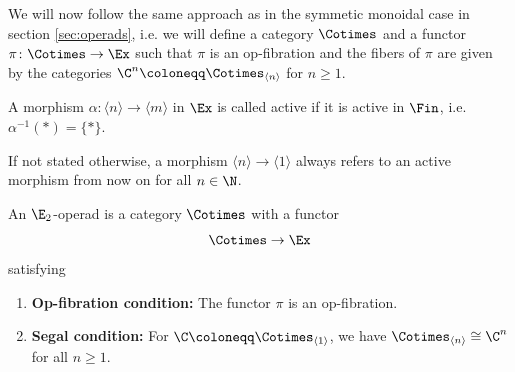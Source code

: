 We will now follow the same approach as in the symmetic monoidal case in section 
\ref{sec:operads}, i.e. we will define a category $\Cotimes$ and a functor 
$\pi \colon \Cotimes \to \Ex$ such that $\pi$ is an op-fibration and the fibers 
of $\pi$ are given by the categories $\C^n \coloneqq \Cotimes_{\langle n \rangle}$ for $n \geq 1$.

\begin{defin}
    A morphism $\alpha \colon \langle n \rangle \to \langle m \rangle$ in $\Ex$
    is called active if it is active in $\Fin$, i.e. $\alpha^{-1}(\ast) = \{\ast\}$.
\end{defin}

If not stated otherwise, a morphism $\langle n \rangle \to \langle 1 \rangle$ 
always refers to an active morphism from now on for all $n \in \N$.

\begin{defin}
    An $\E_2$-operad is a category $\Cotimes$ with a functor
    \[
        \Cotimes \to \Ex
    \]
    satisfying
        \begin{enumerate}[(M1)]
            \item \textbf{Op-fibration condition:} The functor $\pi$ is an op-fibration.
            \item \textbf{Segal condition:} For $\C \coloneqq \Cotimes_{\langle 1 \rangle}$, we have $\Cotimes_{\langle n \rangle} \cong \C^n$ for all $n \geq 1$. 
        \end{enumerate}

\end{defin}



